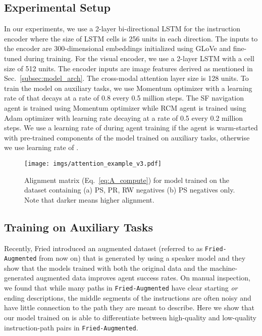 \documentclass[10pt,twocolumn,letterpaper]{article}
\newcommand{\friedaug}{\texttt{Fried-Augmented}}
\begin{document}
\subsection{Experimental Setup}
In our experiments, we use a 2-layer bi-directional LSTM for the instruction encoder where the size of LSTM cells is 256 units in each direction. The inputs to the encoder are 300-dimensional embeddings initialized using GLoVe and fine-tuned during training. For the visual encoder, we use a 2-layer LSTM with a cell size of 512 units. The encoder inputs are image features derived as mentioned in Sec.~\ref{subsec:model_arch}. The cross-modal attention layer size is 128 units. To train the model on auxiliary tasks, we use Momentum optimizer with a learning rate of  that decays at a rate of 0.8 every 0.5 million steps. The SF navigation agent is trained using Momentum optimizer while RCM agent is trained using Adam optimizer with learning rate decaying at a rate of 0.5 every 0.2 million steps. We use a learning rate of  during agent training if the agent is warm-started with pre-trained components of the model trained on auxiliary tasks, otherwise we use learning rate of .

\begin{figure*}
\centering
\texttt{[image: imgs/attention\_example\_v3.pdf]}
\caption{Alignment matrix (Eq.~\ref{eq:A_compute}) for model trained on the dataset containing (a) PS, PR, RW negatives (b) PS negatives only. Note that darker means higher alignment. \label{fig:curriculum-learning-attention}}
\end{figure*}


\subsection{Training on Auxiliary Tasks}
Recently, Fried \etal \cite{Fried:2018:Speaker} introduced an augmented dataset (referred to as {\friedaug} from now on) that is generated by using a speaker model and they show that the models trained with both the original data and the machine-generated augmented data improves agent success rates. On manual inspection, we found that while many paths in {\friedaug} have clear starting \textit{or} ending descriptions, the middle segments of the instructions are often noisy and have little connection to the path they are meant to describe. Here we show that our model trained on {\taskcma} is able to differentiate between high-quality and low-quality instruction-path pairs in {\friedaug}.
\end{document}
